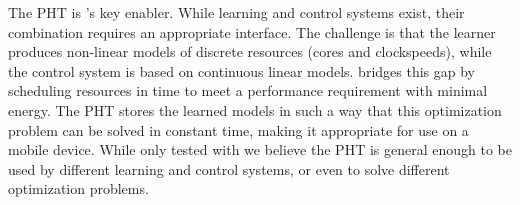 The PHT is \SYSTEM{}'s key enabler.  While learning and control
systems exist, their combination requires an appropriate interface.
The challenge is that the learner produces non-linear models of
discrete resources (\eg cores and clockspeeds), while the control
system is based on continuous linear models.  \SYSTEM{} bridges this
gap by scheduling resources in time to meet a performance requirement
with minimal energy.  The PHT stores the learned models in such a way
that this optimization problem can be solved in constant time, making
it appropriate for use on a mobile device.  While only tested with
\SYSTEM{} we believe the PHT is general enough to be used by different
learning and control systems, or even to solve different optimization
problems.



